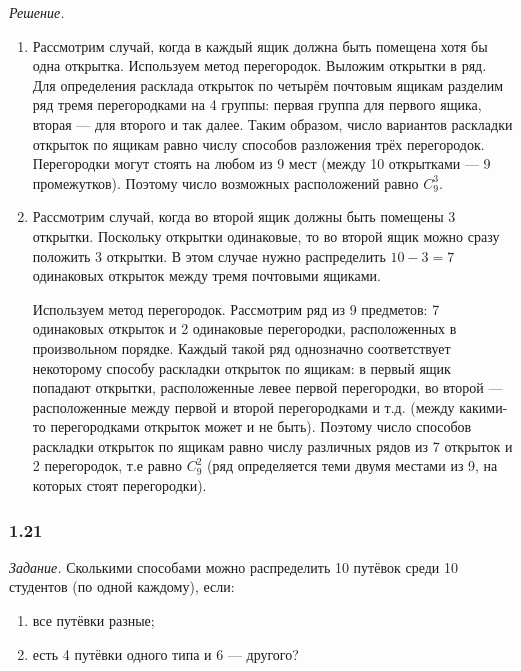 \textit{Решение.}
\begin{enumerate}[label=\alph*)]
\item Рассмотрим случай, когда в каждый ящик должна быть помещена хотя бы одна открытка.
Используем метод перегородок.
Выложим открытки в ряд.
Для определения расклада открыток по четырём почтовым ящикам разделим ряд тремя перегородками на 4 группы:
первая группа для первого ящика, вторая --- для второго и так далее.
Таким образом, число вариантов раскладки открыток по ящикам равно числу способов разложения трёх перегородок.
Перегородки могут стоять на любом из 9 мест (между 10 открытками --- 9 промежутков).
Поэтому число возможных расположений равно $ C_9^3 $.

\item Рассмотрим случай, когда во второй ящик должны быть помещены 3 открытки.
Поскольку открытки одинаковые, то во второй ящик можно сразу положить 3 открытки.
В этом случае нужно распределить $ 10 - 3 = 7$ одинаковых открыток между тремя почтовыми ящиками.

Используем метод перегородок.
Рассмотрим ряд из 9 предметов: 7 одинаковых открыток и 2 одинаковые перегородки, расположенных в произвольном порядке.
Каждый такой ряд однозначно соответствует некоторому способу раскладки открыток по ящикам:
в первый ящик попадают открытки, расположенные левее первой перегородки,
во второй --- расположенные между первой и второй перегородками и т.д. (между какими-то перегородками открыток может и не быть).
Поэтому число способов раскладки открыток по ящикам равно числу различных рядов из 7 открыток и 2 перегородок,
т.е равно $ C_9^2 $ (ряд определяется теми двумя местами из 9, на которых стоят перегородки).
\end{enumerate}

\subsubsection*{1.21}

\textit{Задание.} Сколькими способами можно распределить 10 путёвок среди 10 студентов (по одной каждому), если:
\begin{enumerate}[label=\alph*)]
\item все путёвки разные;
\item есть 4 путёвки одного типа и 6 --- другого?
\end{enumerate}

